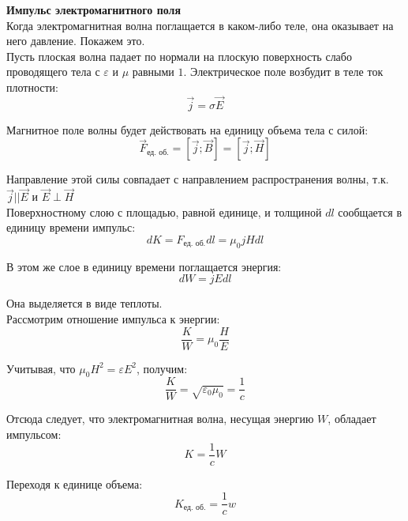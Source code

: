 \documentclass{article}
\begin{document}
	
	\textbf{Импульс электромагнитного поля}\\

	Когда электромагнитная волна поглащается в каком-либо теле, она оказывает на него давление. Покажем это.\\

	Пусть плоская волна падает по нормали на плоскую поверхность слабо проводящего тела с $\varepsilon$ и $\mu$ равными $1$. Электрическое поле возбудит в теле ток плотности:
	\begin{equation}
		\vec j = \sigma\vec E
	\end{equation}

	Магнитное поле волны будет действовать на единицу объема тела с силой:
	\begin{equation}
		\vec F_\text{ед. об.}=[\vec j;\vec B] = [\vec j;\vec H]
	\end{equation}

	Направление этой силы совпадает с направлением распространения волны, т.к. $\vec j || \vec E$ и $\vec E\perp\vec H$\\

	Поверхностному слою с площадью, равной единице, и толщиной $dl$ сообщается в единицу времени импульс:
	\begin{equation}
		dK = F_\text{ед. об.} dl = \mu_0 j H dl
	\end{equation}

	В этом же слое в единицу времени поглащается энергия:
	\begin{equation}
		dW = jEdl
	\end{equation}

	Она выделяется в виде теплоты.\\

	Рассмотрим отношение импульса к энергии:
	\begin{equation}
		\frac{K}{W}=\mu_0\frac{H}{E}
	\end{equation}

	Учитывая, что $\mu_0H^2 = \varepsilon E^2$, получим:
	\begin{equation}
		\frac{K}{W} = \sqrt{\varepsilon_0\mu_0}=\frac{1}{c}
	\end{equation}

	Отсюда следует, что электромагнитная волна, несущая энергию $W$, обладает импульсом:
	\begin{equation}
		K=\frac{1}{c}W
	\end{equation}

	Переходя к единице объема:
	\begin{equation}
		K_\text{ед. об.} = \frac{1}{c}w
	\end{equation}
\end{document}
